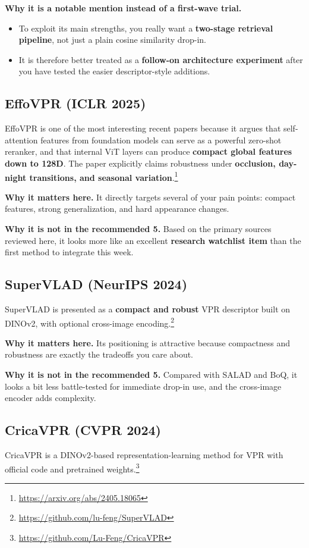 \documentclass[11pt]{article}
\begin{document}
\textbf{Why it is a notable mention instead of a first-wave trial.}
\begin{itemize}[leftmargin=*]
  \item To exploit its main strengths, you really want a \textbf{two-stage retrieval pipeline}, not just a plain cosine similarity drop-in.
  \item It is therefore better treated as a \textbf{follow-on architecture experiment} after you have tested the easier descriptor-style additions.
\end{itemize}

\subsection*{EffoVPR (ICLR 2025)}
EffoVPR is one of the most interesting recent papers because it argues that self-attention features from foundation models can serve as a powerful zero-shot reranker, and that internal ViT layers can produce \textbf{compact global features down to 128D}. The paper explicitly claims robustness under \textbf{occlusion, day-night transitions, and seasonal variation}.\footnote{\url{https://arxiv.org/abs/2405.18065}}

\textbf{Why it matters here.} It directly targets several of your pain points: compact features, strong generalization, and hard appearance changes.

\textbf{Why it is not in the recommended 5.} Based on the primary sources reviewed here, it looks more like an excellent \textbf{research watchlist item} than the first method to integrate this week.

\subsection*{SuperVLAD (NeurIPS 2024)}
SuperVLAD is presented as a \textbf{compact and robust} VPR descriptor built on DINOv2, with optional cross-image encoding.\footnote{\url{https://github.com/lu-feng/SuperVLAD}}

\textbf{Why it matters here.} Its positioning is attractive because compactness and robustness are exactly the tradeoffs you care about.

\textbf{Why it is not in the recommended 5.} Compared with SALAD and BoQ, it looks a bit less battle-tested for immediate drop-in use, and the cross-image encoder adds complexity.

\subsection*{CricaVPR (CVPR 2024)}
CricaVPR is a DINOv2-based representation-learning method for VPR with official code and pretrained weights.\footnote{\url{https://github.com/Lu-Feng/CricaVPR}}
\end{document}
